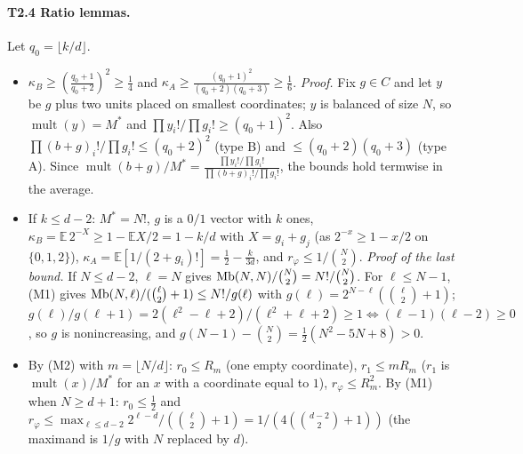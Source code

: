 \documentclass[11pt]{article}
\newcommand{\E}{\mathbb{E}}
\newcommand{\mult}{\operatorname{mult}}
\theoremstyle{definition}
\theoremstyle{remark}
\begin{document}
\paragraph{T2.4 Ratio lemmas.} Let $q_0=\lfloor k/d\rfloor$.
\begin{itemize}
\item[(K)] $\kappa_B\ge(\frac{q_0+1}{q_0+2})^2\ge\frac14$ and $\kappa_A\ge\frac{(q_0+1)^2}{(q_0+2)(q_0+3)}\ge\frac16$. \emph{Proof.} Fix $g\in C$ and let $y$ be
$g$ plus two units placed on smallest coordinates; $y$ is balanced of size $N$, so $\mult(y)=M^\ast$ and $\prod y_i!/\prod g_i!\ge(q_0+1)^2$.
Also $\prod(b+g)_i!/\prod g_i!\le(q_0+2)^2$ (type B) and $\le(q_0+2)(q_0+3)$ (type A). Since $\mult(b+g)/M^\ast=\frac{\prod y_i!/\prod g_i!}{\prod(b+g)_i!/\prod g_i!}$,
the bounds hold termwise in the average.
\item[(K0)] If $k\le d-2$: $M^\ast=N!$, $g$ is a $0/1$ vector with $k$ ones, $\kappa_B=\E\,2^{-X}\ge1-\E X/2=1-k/d$ with $X=g_i+g_j$ (as
$2^{-x}\ge1-x/2$ on $\{0,1,2\}$), $\kappa_A=\E[1/(2+g_i)!]=\frac12-\frac k{3d}$, and $r_\varphi\le1/\binom N2$. \emph{Proof of the last
bound.} If $N\le d-2$, $\ell=N$ gives $\mathrm{Mb}(N,N)/\binom N2=N!/\binom N2$. For $\ell\le N-1$, (M1) gives $\mathrm{Mb}(N,\ell)/(\binom\ell2+1)\le N!/g(\ell)$
with $g(\ell)=2^{N-\ell}(\binom\ell2+1)$; $g(\ell)/g(\ell+1)=2(\ell^2-\ell+2)/(\ell^2+\ell+2)\ge1\iff(\ell-1)(\ell-2)\ge0$, so $g$ is
nonincreasing, and $g(N-1)-\binom N2=\frac12(N^2-5N+8)>0$.
\item[(Moves)] By (M2) with $m=\lfloor N/d\rfloor$: $r_0\le R_m$ (one empty coordinate), $r_1\le mR_m$ ($r_1$ is $\mult(x)/M^\ast$ for an $x$ with a
coordinate equal to $1$), $r_\varphi\le R_m^2$. By (M1) when $N\ge d+1$: $r_0\le\frac12$ and
$r_\varphi\le\max_{\ell\le d-2}2^{\ell-d}/(\binom\ell2+1)=1/(4(\binom{d-2}2+1))$ (the maximand is $1/g$ with $N$ replaced by $d$).
\end{itemize}
\end{document}
